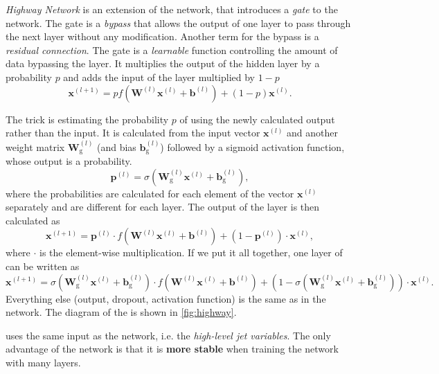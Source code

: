 \emph{Highway Network} \cite{highway} is an extension of the \fc network, that introduces a \emph{gate} to the network.
The gate is a \emph{bypass} that allows the output of one layer to pass through the next layer without any modification.
Another term for the bypass is a \emph{residual connection}.
The gate is a \emph{learnable} function controlling the amount of data bypassing the layer.
It multiplies the output of the hidden layer by a probability $p$ and adds the input of the layer multiplied by $1 - p$
\begin{equation}
    \pmb{x}^{(l + 1)} = p f(\pmb{W}^{(l)} \pmb{x}^{(l)} + \pmb{b}^{(l)}) + (1 - p) \pmb{x}^{(l)} . 
\end{equation}

The trick is estimating the probability $p$ of using the newly calculated output rather than the input.
It is calculated from the input vector $\pmb{x}^{(l)}$ and another weight matrix $\pmb{W}^{(l)}_{\text{g}}$ (and bias $\pmb{b}^{(l)}_{\text{g}}$) followed by a sigmoid activation function, whose output is a probability.
\begin{equation}
    \pmb{p}^{(l)} = \sigma(\pmb{W}^{(l)}_{\text{g}} \pmb{x}^{(l)} + \pmb{b}^{(l)}_{\text{g}}),
\end{equation}
where the probabilities are calculated for each element of the vector $\pmb{x}^{(l)}$ separately and are different for each layer.
The output of the \highway layer is then calculated as
\begin{equation}
    \pmb{x}^{(l + 1)} = \pmb{p}^{(l)} \cdot f(\pmb{W}^{(l)} \pmb{x}^{(l)} + \pmb{b}^{(l)}) + (1 - \pmb{p}^{(l)}) \cdot \pmb{x}^{(l)} ,
\end{equation}
where $\cdot$ is the element-wise multiplication.
If we put it all together, one layer of \highway can be written as
\begin{equation}
    \pmb{x}^{(l + 1)} = \sigma(\pmb{W}^{(l)}_{\text{g}} \pmb{x}^{(l)} + \pmb{b}^{(l)}_{\text{g}}) \cdot f(\pmb{W}^{(l)} \pmb{x}^{(l)} + \pmb{b}^{(l)}) + (1 - \sigma(\pmb{W}^{(l)}_{\text{g}} \pmb{x}^{(l)} + \pmb{b}^{(l)}_{\text{g}})) \cdot \pmb{x}^{(l)}.
\end{equation}
Everything else (output, dropout, activation function) is the same as in the \fc network.
The diagram of the \highway is shown in \cref{fig:highway}.

\highway uses the same input as the \fc network, i.e. the \emph{high-level jet variables}.
The only advantage of the \highway network is that it is \textbf{more stable} when training the network with many layers.

